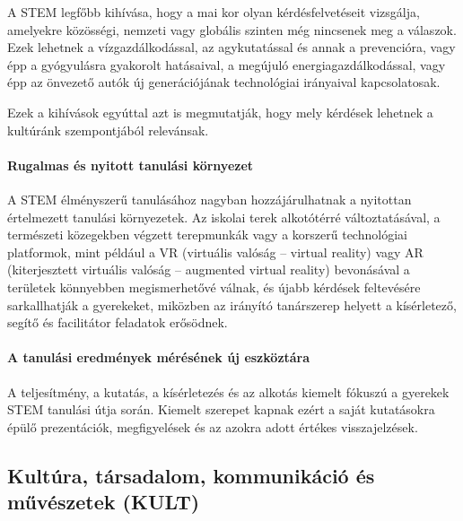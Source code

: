 A STEM legfőbb kihívása, hogy a mai kor olyan kérdésfelvetéseit
vizsgálja, amelyekre közösségi, nemzeti vagy globális\break
szinten még
nincsenek meg a válaszok. Ezek lehetnek a vízgazdálkodással, az
agykutatással és annak a prevencióra, vagy épp a gyógyulásra gyakorolt
hatásaival, a megújuló energiagazdálkodással, vagy épp az önvezető autók
új generációjának technológiai irányaival kapcsolatosak.

Ezek a kihívások egyúttal azt is megmutatják, hogy mely kérdések
lehetnek a kultúránk szempontjából relevánsak.

\hypertarget{rugalmas-es-nyitott-tanulasi-kornyezet}{%
\paragraph{Rugalmas és nyitott tanulási
környezet}\label{rugalmas-es-nyitott-tanulasi-kornyezet}}

A STEM élményszerű tanulásához nagyban hozzájárulhatnak a nyitottan
értelmezett tanulási környezetek. Az iskolai terek alkotótérré
változtatásával, a természeti közegekben végzett terepmunkák vagy a
korszerű technológiai platformok, mint például a VR (virtuális valóság
-- virtual reality) vagy AR (kiterjesztett virtuális valóság --
augmented virtual reality) bevonásával a területek könnyebben
megismerhetővé válnak, és újabb kérdések feltevésére sarkallhatják a
gyerekeket, miközben az irányító tanárszerep helyett a kísérletező,
segítő és facilitátor feladatok erősödnek.

\hypertarget{a-tanulasi-eredmenyek-meresenek-uj-eszkoztara}{%
\paragraph{A tanulási eredmények mérésének új
eszköztára}\label{a-tanulasi-eredmenyek-meresenek-uj-eszkoztara}}

A teljesítmény, a kutatás, a kísérletezés és az alkotás kiemelt fókuszú
a gyerekek STEM tanulási útja során. Kiemelt szerepet kapnak ezért a
saját kutatásokra épülő prezentációk, megfigyelések és az azokra adott
értékes visszajelzések.

\hypertarget{kultura-tarsadalom-kommunikacio-es-muveszetek-kult}{%
\subsection{Kultúra, társadalom, kommunikáció és művészetek
(KULT)}\label{kultura-tarsadalom-kommunikacio-es-muveszetek-kult}}

